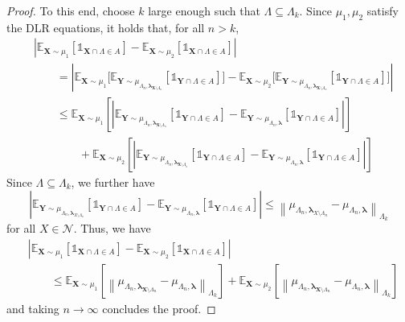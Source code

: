 \documentclass[10pt]{amsart}
\theoremstyle{definition}
\theoremstyle{remark}
\newcommand{\pointsets}{\mathcal{N}}
\newcommand{\ind}[1]{\mathds{1}_{#1}}
\newcommand{\bX}{\mathbf{X}}
\newcommand{\bY}{\mathbf{Y}}
\newcommand{\E}{\mathbb{E}}
\newcommand{\region}{\Lambda}
\newcommand{\activities}{\pmb{\lambda}}
\newcommand{\absolute}[1]{\left\lvert#1\right\rvert}
\begin{document}
\begin{proof}
		To this end, choose $k$ large enough such that $\region \subseteq \region_k$.
		Since $\mu_1, \mu_2$ satisfy the DLR equations, it holds that, for all $n > k$,
		\begin{align*}
			&\absolute{\E_{\bX \sim \mu_1}[\ind{\bX \cap \region \in A}] - \E_{\bX \sim \mu_2}[\ind{\bX \cap \region \in A}]} \\
			&\hspace{2em}= \absolute{\E_{\bX \sim \mu_1}\big[\E_{\bY \sim \mu_{\region_n, \activities_{\bX \setminus \region_n}}}[\ind{\bY \cap \region \in A}]\big] - \E_{\bX \sim \mu_2}\big[\E_{\bY \sim \mu_{\region_n, \activities_{\bX \setminus \region_n}}}[\ind{\bY \cap \region \in A}]\big]} \\
			&\hspace{2em} \le \E_{\bX \sim \mu_1}\left[\absolute{\E_{\bY \sim \mu_{\region_n, \activities_{\bX \setminus \region_n}}}[\ind{\bY \cap \region \in A}] - \E_{\bY \sim \mu_{\region_n, \activities}}[\ind{\bY \cap \region \in A}]}\right] \\  
			&\hspace{4em}+ \E_{\bX \sim \mu_2}\left[\absolute{\E_{\bY \sim \mu_{\region_n, \activities_{\bX \setminus \region_n}}}[\ind{\bY \cap \region \in A}] - \E_{\bY \sim \mu_{\region_n, \activities}}[\ind{\bY \cap \region \in A}]}\right]
		\end{align*}
		Since $\region \subseteq \region_k$, we further have 
		\[
		\absolute{\E_{\bY \sim \mu_{\region_n, \activities_{X \setminus \region_n}}}[\ind{\bY \cap \region \in A}] - \E_{\bY \sim \mu_{\region_n, \activities}}[\ind{\bY \cap \region \in A}]} \le \left\|{\mu_{\region_n, \activities_{X \setminus \region_n}} - \mu_{\region_n, \activities}}\right\|_{\region_k}
		\]
		for all $X \in \pointsets$.
		Thus, we have 
		\begin{align*}
			&\absolute{\E_{\bX \sim \mu_1}[\ind{\bX \cap \region \in A}] - \E_{\bX \sim \mu_2}[\ind{\bX \cap \region \in A}]} \\
			&\hspace{2em}\le \E_{\bX \sim \mu_1}\left[\left\|{\mu_{\region_n, \activities_{\bX \setminus \region_n}} - \mu_{\region_n, \activities}}\right\|_{\region_k}\right] + \E_{\bX \sim \mu_2}\left[\left\|{\mu_{\region_n, \activities_{\bX \setminus \region_n}} - \mu_{\region_n, \activities}}\right\|_{\region_k}\right]
		\end{align*}
		and taking $n \to \infty$ concludes the proof.
	\end{proof}
	
\end{document}
